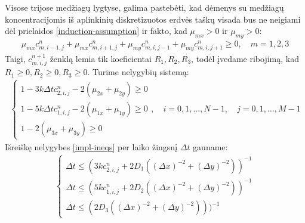 Visose trijose medžiagų lygtyse, galima pastebėti, kad dėmenys su medžiagų koncentracijomis iš aplinkinių diskretizuotos erdvės taškų visada bus ne neigiami dėl prielaidos \eqref{induction-assumption} ir fakto, kad $\mu_{mx}>0$ ir $\mu_{my}>0$:
\begin{align*}
  \mu_{mx}c^n_{m,i-1,j}+\mu_{mx}c^n_{m,i+1,j}+\mu_{my}c^n_{m,i,j-1}+\mu_{my}c^n_{m,i,j+1}\geqslant 0 ,\quad m=1,2,3
\end{align*}
\newpage
Taigi, $c^{n+1}_{m,i,j}$ ženklą lemia tik koeficientai $R_1, R_2, R_3$, todėl įvedame ribojimą, kad $R_1\geqslant 0, R_2\geqslant 0, R_3\geqslant 0$. Turime nelygybių sistemą:
\begin{align} \label{impl-ineqs}
  \begin{cases}
    1-3k\Delta tc^{n}_{2,i,j}-2(\mu_{2x}+\mu_{2y})\geqslant 0\\
    1-5k\Delta tc^{n}_{1,i,j}-2(\mu_{1x}+\mu_{1y})\geqslant 0\\
    1-2(\mu_{3x}+\mu_{3y})\geqslant 0
  \end{cases}, \quad i=0,1,\dots,N-1, \quad j=0,1,\dots,M-1
\end{align}
Išreiškę nelygybes \eqref{impl-ineqs} per laiko žingsnį $\Delta t$ gauname:
\begin{align} \label{dt-ineq}
  \begin{cases}
    \Delta t \leqslant (3kc^{n}_{2,i,j}+2D_1((\Delta x)^{-2}+(\Delta y)^{-2}))^{-1}\\
    \Delta t \leqslant (5kc^{n}_{1,i,j}+2D_2((\Delta x)^{-2}+(\Delta y)^{-2}))^{-1}\\
    \Delta t \leqslant (2D_3((\Delta x)^{-2}+(\Delta y)^{-2})))^{-1}
  \end{cases}
\end{align}

